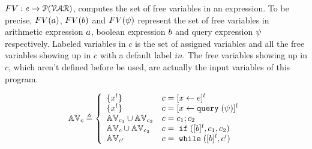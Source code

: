 {$FV: e \to \mathcal{P}(\mathcal{VAR})$, computes the set of free variables in an expression. To be precise,
$FV(a)$, $FV(b)$ and $FV(\psi)$ represent the set of free variables in arithmetic
expression $a$, boolean expression $b$ and query expression $\psi$ respectively.
Labeled variables in $c$ is the set of assigned variables and all the free variables
showing up in $c$ with a default label $in$. 
The free variables
showing up in $c$, which aren't defined before be used, are actually the input variables of this program.
%
\begin{defn}
\label{def:avar}
{\footnotesize
$$ \avar_{c} \triangleq
  \left\{
  \begin{array}{ll}
      \{{x}^l\}                   
      & {c} = [{\assign x e}]^{l} 
      \\
      \{{x}^l\}                   
      & {c} = [{\assign x \query(\qexpr)}]^{l} 
      \\
      \avar_{{c_1}} \cup \avar_{{c_2}}  
      & {c} = {c_1};{c_2}
      \\
      \avar_{{c}} \cup \avar_{{c_2}} 
      & {c} =\eif([\bexpr]^{l}, c_1, c_2) 
      \\
      \avar_{{c}'}
      & {c}   = \ewhile ([\bexpr]^{l}, {c}')
\end{array}
\right.
$$
}
\end{defn}
%

}
